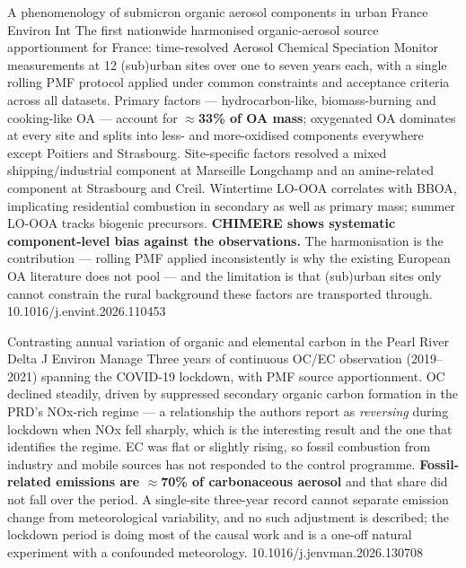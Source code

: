 \documentclass[10pt]{article}
\begin{document}
{A phenomenology of submicron organic aerosol components in urban France}
{Environ Int}
{The first nationwide harmonised organic-aerosol source apportionment for France:
time-resolved Aerosol Chemical Speciation Monitor measurements at 12 (sub)urban sites over
one to seven years each, with a single rolling PMF protocol applied under common
constraints and acceptance criteria across all datasets. Primary factors --- hydrocarbon-like,
biomass-burning and cooking-like OA --- account for \textbf{$\approx$33\% of OA mass};
oxygenated OA dominates at every site and splits into less- and more-oxidised components
everywhere except Poitiers and Strasbourg. Site-specific factors resolved a mixed
shipping/industrial component at Marseille Longchamp and an amine-related component at
Strasbourg and Creil. Wintertime LO-OOA correlates with BBOA, implicating residential
combustion in secondary as well as primary mass; summer LO-OOA tracks biogenic precursors.
\textbf{CHIMERE shows systematic component-level bias against the observations.} The
harmonisation is the contribution --- rolling PMF applied inconsistently is why the existing
European OA literature does not pool --- and the limitation is that (sub)urban sites only
cannot constrain the rural background these factors are transported through.}
{10.1016/j.envint.2026.110453}

{Contrasting annual variation of organic and elemental carbon in the Pearl River Delta}
{J Environ Manage}
{Three years of continuous OC/EC observation (2019--2021) spanning the COVID-19 lockdown,
with PMF source apportionment. OC declined steadily, driven by suppressed secondary organic
carbon formation in the PRD's NOx-rich regime --- a relationship the authors report as
\emph{reversing} during lockdown when NOx fell sharply, which is the interesting result and
the one that identifies the regime. EC was flat or slightly rising, so fossil combustion
from industry and mobile sources has not responded to the control programme.
\textbf{Fossil-related emissions are $\approx$70\% of carbonaceous aerosol} and that share
did not fall over the period. A single-site three-year record cannot separate emission
change from meteorological variability, and no such adjustment is described; the lockdown
period is doing most of the causal work and is a one-off natural experiment with a
confounded meteorology.}
{10.1016/j.jenvman.2026.130708}
\end{document}
